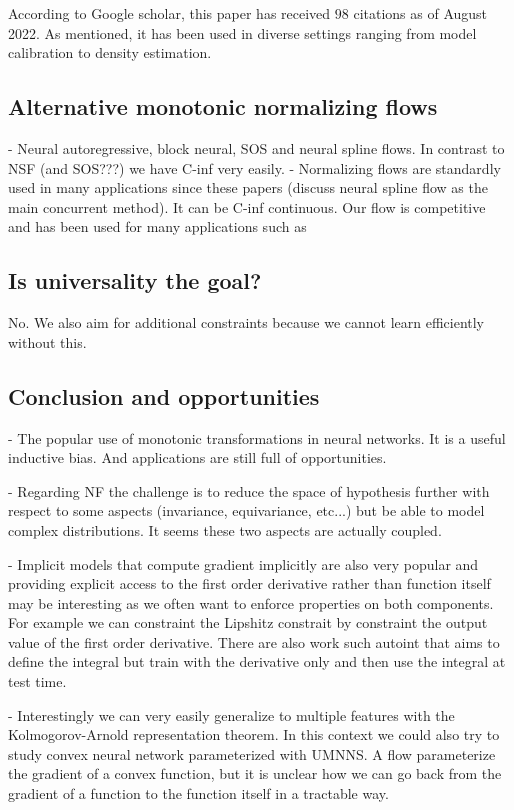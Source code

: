 According to Google scholar, this paper has received $98$ citations as of August 2022. As mentioned, it has been used in diverse settings ranging from model calibration to density estimation.




\subsection{Alternative monotonic normalizing flows}
- Neural autoregressive, block neural, SOS and neural spline flows. In contrast to NSF (and SOS???) we have C-inf very easily.
- Normalizing flows are standardly used in many applications since these papers (discuss neural spline flow as the main concurrent method). It can be C-inf continuous. Our flow is competitive and has been used for many applications such as
\subsection{Is universality the goal?}
No. We also aim for additional constraints because we cannot learn efficiently without this.

\subsection{Conclusion and opportunities}
- The popular use of monotonic transformations in neural networks. It is a useful inductive bias. And applications are still full of opportunities.

- Regarding NF the challenge is to reduce the space of hypothesis further with respect to some aspects (invariance, equivariance, etc...) but be able to model complex distributions. It seems these two aspects are actually coupled.

- Implicit models that compute gradient implicitly are also very popular and providing explicit access to the first order derivative rather than function itself may be interesting as we often want to enforce properties on both components. For example we can constraint the Lipshitz constrait by constraint the output value of the first order derivative. There are also work such autoint that aims to define the integral but train with the derivative only and then use the integral at test time.

- Interestingly we can very easily generalize to multiple features with the Kolmogorov-Arnold representation theorem. In this context we could also try to study convex neural network parameterized with UMNNS. A flow parameterize the gradient of a convex function, but it is unclear how we can go back from the gradient of a function to the function itself in a tractable way.
